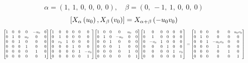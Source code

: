 \documentclass[11pt]{article}
\theoremstyle{definition}
\begin{document}
\[
\alpha = \left( 1, \  1, \  0, \  0, \  0, \  0\right), \quad \beta = \left( 0, \  -1, \  1, \  0, \  0, \  0\right)
\]
\[
\scaletoalign{\textwidth}{\left[ X_{\alpha}\left(u_{0}\right), X_{\beta}\left(v_{0}\right) \right] = X_{\alpha + \beta}\left(- u_{0} v_{0}\right)}
\]
\[
\scaletoalign{\textwidth}{{\left[\begin{matrix}1 & 0 & 0 & 0 & - u_{0} & 0\\0 & 1 & 0 & u_{0} & 0 & 0\\0 & 0 & 1 & 0 & 0 & 0\\0 & 0 & 0 & 1 & 0 & 0\\0 & 0 & 0 & 0 & 1 & 0\\0 & 0 & 0 & 0 & 0 & 1\end{matrix}\right]} {\left[\begin{matrix}1 & 0 & 0 & 0 & 0 & 0\\0 & 1 & 0 & 0 & 0 & 0\\0 & v_{0} & 1 & 0 & 0 & 0\\0 & 0 & 0 & 1 & 0 & 0\\0 & 0 & 0 & 0 & 1 & - v_{0}\\0 & 0 & 0 & 0 & 0 & 1\end{matrix}\right]} {\left[\begin{matrix}1 & 0 & 0 & 0 & u_{0} & 0\\0 & 1 & 0 & - u_{0} & 0 & 0\\0 & 0 & 1 & 0 & 0 & 0\\0 & 0 & 0 & 1 & 0 & 0\\0 & 0 & 0 & 0 & 1 & 0\\0 & 0 & 0 & 0 & 0 & 1\end{matrix}\right]} {\left[\begin{matrix}1 & 0 & 0 & 0 & 0 & 0\\0 & 1 & 0 & 0 & 0 & 0\\0 & - v_{0} & 1 & 0 & 0 & 0\\0 & 0 & 0 & 1 & 0 & 0\\0 & 0 & 0 & 0 & 1 & v_{0}\\0 & 0 & 0 & 0 & 0 & 1\end{matrix}\right]} = {\left[\begin{matrix}1 & 0 & 0 & 0 & 0 & u_{0} v_{0}\\0 & 1 & 0 & 0 & 0 & 0\\0 & 0 & 1 & - u_{0} v_{0} & 0 & 0\\0 & 0 & 0 & 1 & 0 & 0\\0 & 0 & 0 & 0 & 1 & 0\\0 & 0 & 0 & 0 & 0 & 1\end{matrix}\right]}}
\]
\end{document}
